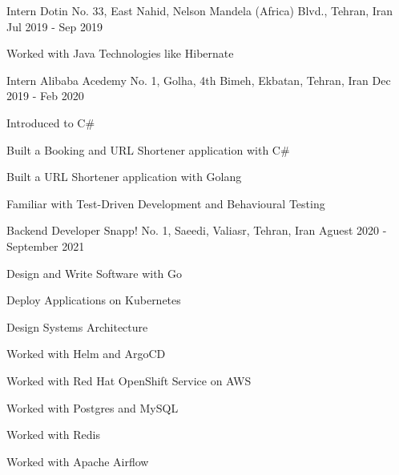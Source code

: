 
\begin{cventries}

  \cventry
    {Intern} %
    {Dotin} %
    {No. 33, East Nahid, Nelson Mandela (Africa) Blvd., Tehran, Iran} %
    {Jul 2019 - Sep 2019} %
    {
      \begin{cvitems} %
        \item {Worked with Java Technologies like Hibernate}
      \end{cvitems}
    }

  \cventry
    {Intern} %
    {Alibaba Acedemy} %
    {No. 1, Golha, 4th Bimeh, Ekbatan, Tehran, Iran} %
    {Dec 2019 - Feb 2020} %
    {
      \begin{cvitems} %
        \item {Introduced to C\#}
        \item {Built a Booking and URL Shortener application with C\#}
        \item {Built a URL Shortener application with Golang}
        \item {Familiar with Test-Driven Development and Behavioural Testing}
      \end{cvitems}
    }

  \cventry
    {Backend Developer} %
    {Snapp!} %
    {No. 1, Saeedi, Valiasr, Tehran, Iran} %
    {Aguest 2020 - September 2021} %
    {
      \begin{cvitems} %
        \item {Design and Write Software with Go}
        \item {Deploy Applications on Kubernetes}
        \item {Design Systems Architecture}
        \item {Worked with Helm and ArgoCD}
        \item {Worked with Red Hat OpenShift Service on AWS}
        \item {Worked with Postgres and MySQL}
        \item {Worked with Redis}
        \item {Worked with Apache Airflow}
      \end{cvitems}
    }


\end{cventries}
